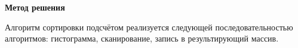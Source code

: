 \textbf{\large Метод решения}

Алгоритм сортировки подсчётом реализуется следующей последовательностью алгоритмов: гистограмма, сканирование, запись в результирующий массив.

